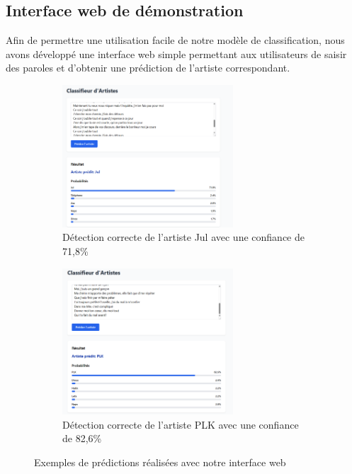 \documentclass[a4paper,11pt]{article}
\begin{document}
\subsection{Interface web de démonstration}
Afin de permettre une utilisation facile de notre modèle de classification, nous avons développé une interface web simple permettant aux utilisateurs de saisir des paroles et d'obtenir une prédiction de l'artiste correspondant.

\begin{figure}[ht]
    \centering
    \begin{subfigure}[b]{0.8\textwidth}
        \centering
        \includegraphics[width=0.7\textwidth]{results_rapport/jul_fixed.png}
        \caption{Détection correcte de l'artiste Jul avec une confiance de 71,8\%}
        \label{fig:jul-detection}
    \end{subfigure}
    \vspace{0.5cm}
    \begin{subfigure}[b]{0.8\textwidth}
        \centering
        \includegraphics[width=0.7\textwidth]{results_rapport/plk_fixed.png}
        \caption{Détection correcte de l'artiste PLK avec une confiance de 82,6\%}
        \label{fig:plk-detection}
    \end{subfigure}
    \caption{Exemples de prédictions réalisées avec notre interface web}
    \label{fig:web-interface}
\end{figure}
\end{document}
